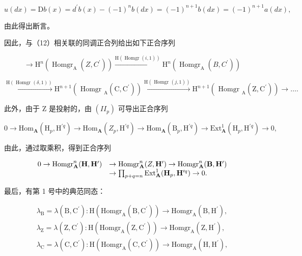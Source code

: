 \[
u (d x) = \mathrm{D} b (x) = d ^ {\prime} b (x) - (- 1) ^ {n} b (d x) = (- 1) ^ {n + 1} b (d x) = (- 1) ^ {n + 1} a (d x),
\]

由此得出断言。

因此，与（12）相关联的同调正合列给出如下正合序列

\[
\rightarrow \mathrm{H} ^ {n} (\operatorname{Homgr} _ {\mathrm{A}} (Z, C ^ {\prime})) \xrightarrow {\mathrm{H} (\operatorname{Homgr} (i , 1))} \mathrm{H} ^ {n} (\operatorname{Homgr} _ {\mathrm{A}} (B, C ^ {\prime}))
\]

\[
\xrightarrow {\mathrm{H} (\text { Homgr } (\delta , 1))} \mathrm{H} ^ {n + 1} \left(\text { Homgr } _ {\mathrm{A}} \left(\mathrm{C}, \mathrm{C} ^ {\prime}\right)\right) \xrightarrow {\mathrm{H} (\text { Homgr } (j , 1))} \mathrm{H} ^ {n + 1} \left(\text { Homgr } _ {\mathrm{A}} \left(\mathrm{Z}, \mathrm{C} ^ {\prime}\right)\right)\rightarrow \dots .
\]

此外，由于 Z 是投射的，由 \((II_{p})\) 可导出正合序列

\[
0 \to \mathrm{Hom} _ {\mathbf {A}} (\mathrm{H} _ {p}, \mathrm{H} ^ {\prime q}) \to \mathrm{Hom} _ {\mathbf {A}} (Z _ {p}, \mathrm{H} ^ {\prime q}) \to \mathrm{Hom} _ {\mathbf {A}} (\mathrm{B} _ {p}, \mathrm{H} ^ {\prime q}) \to \mathrm{Ext} _ {\mathbf {A}} ^ {1} (\mathrm{H} _ {p}, \mathrm{H} ^ {\prime q}) \to 0,
\]

由此，通过取乘积，得到正合序列

\[
\begin{array}{r l} 0 \to \operatorname{Homgr} _ {\mathbf {A}} ^ {n} (\mathbf {H}, \mathbf {H} ^ {\prime}) & \to \operatorname{Homgr} _ {\mathbf {A}} ^ {n} (Z, \mathbf {H} ^ {\prime}) \to \operatorname{Homgr} _ {\mathbf {A}} ^ {n} (\mathbf {B}, \mathbf {H} ^ {\prime}) \\ & \to \prod_ {p + q = n} \operatorname{Ext} _ {\mathbf {A}} ^ {1} (\mathbf {H} _ {p}, \mathbf {H} ^ {\prime q}) \to 0. \end{array}
\]

最后，有第 1 号中的典范同态：

\[
\begin{array}{l} \lambda_ {\mathrm{B}} = \lambda (\mathrm{B}, \mathrm{C} ^ {\prime}): \mathrm{H} (\mathrm{Homgr} _ {\mathrm{A}} (\mathrm{B}, \mathrm{C} ^ {\prime})) \to \mathrm{Homgr} _ {\mathrm{A}} (\mathrm{B}, \mathrm{H} ^ {\prime}), \\ \lambda_ {\mathrm{Z}} = \lambda (\mathrm{Z}, \mathrm{C} ^ {\prime}): \mathrm{H} (\mathrm{Homgr} _ {\mathrm{A}} (\mathrm{Z}, \mathrm{C} ^ {\prime})) \to \mathrm{Homgr} _ {\mathrm{A}} (\mathrm{Z}, \mathrm{H} ^ {\prime}), \\ \lambda_ {\mathrm{C}} = \lambda (\mathrm{C}, \mathrm{C} ^ {\prime}): \mathrm{H} (\mathrm{Homgr} _ {\mathrm{A}} (\mathrm{C}, \mathrm{C} ^ {\prime})) \to \mathrm{Homgr} _ {\mathrm{A}} (\mathrm{H}, \mathrm{H} ^ {\prime}), \end{array}
\]

